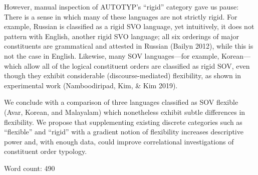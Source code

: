 \documentclass[10pt,letterpaper]{article}
\begin{document}
However, manual inspection of AUTOTYP's ``rigid'' category gave us
pause: There is a sense in which many of these languages are not
strictly rigid. For example, Russian is classified as a rigid SVO
language, yet intuitively, it does not pattern with English, another
rigid SVO language; all six orderings of major constituents are
grammatical and attested in Russian (Bailyn 2012), while this is not the
case in English. Likewise, many SOV languages---for example,
Korean---which allow all of the logical constituent orders are
classified as rigid SOV, even though they exhibit considerable
(discourse-mediated) flexibility, as shown in experimental work
(Namboodiripad, Kim, \& Kim 2019).

We conclude with a comparison of three languages classified as SOV
flexible (Avar, Korean, and Malayalam) which nonetheless exhibit subtle
differences in flexibility. We propose that supplementing existing
discrete categories such as ``flexible'' and ``rigid'' with a gradient
notion of flexibility increases descriptive power and, with enough data,
could improve correlational investigations of constituent order
typology.

\hfill Word count: 490
\end{document}
